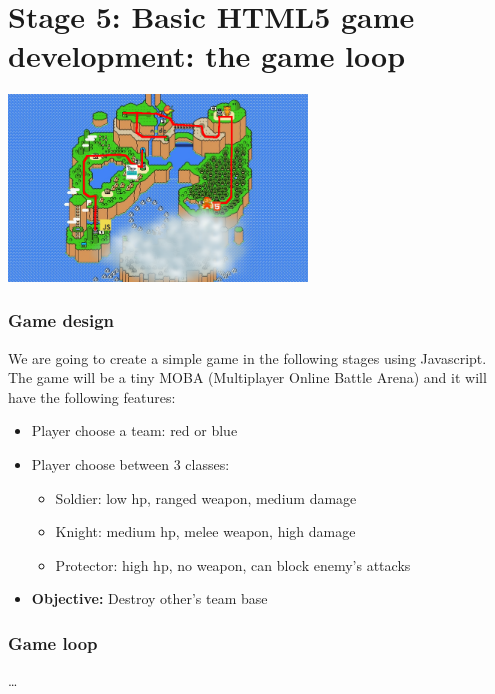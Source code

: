 \section{Stage 5: Basic HTML5 game development: the game loop}

\begin{frame}[fragile]
  \begin{center}
    \includegraphics[width=300px]{images/map_stage_5.png}
  \end{center}
\end{frame}

\begin{frame}[fragile]
  \frametitle{Game design}

  We are going to create a simple game in the following stages using Javascript. The game will be a tiny MOBA (Multiplayer Online Battle Arena) and it will have the following features:

  \pause

  \begin{itemize}
    \pause \item Player choose a team: red or blue
    \pause \item Player choose between 3 classes:
      \begin{itemize}
        \item Soldier: low hp, ranged weapon, medium damage
        \item Knight: medium hp, melee weapon, high damage
        \item Protector: high hp, no weapon, can block enemy's attacks
      \end{itemize}
    \pause \item \textbf{Objective:} Destroy other's team base
  \end{itemize}
\end{frame}

\begin{frame}[fragile]
  \frametitle{Game loop}

  \ldots
\end{frame}

